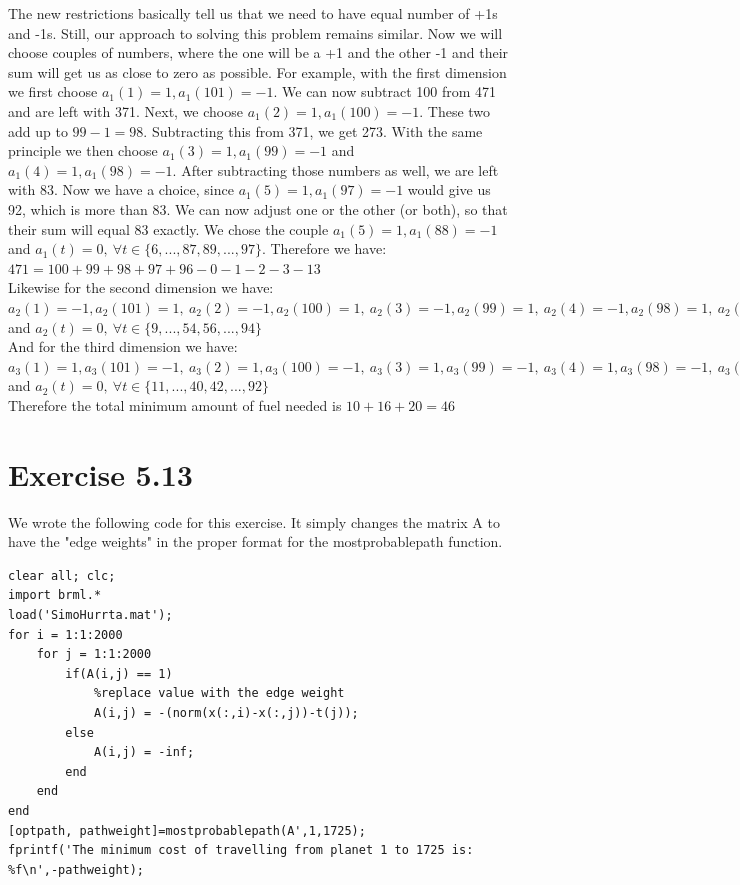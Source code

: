 \documentclass[11pt,a4paper,oneside]{report}
\begin{document}
The new restrictions basically tell us that we need to have equal number of +1s and -1s. Still, our approach to solving this problem remains similar. Now we will choose couples of numbers, where the one will be a +1 and the other -1 and their sum will get us as close to zero as possible. For example, with the first dimension we first choose $a_1(1) = 1, a_1(101) = -1$. We can now subtract 100 from 471 and are left with 371. Next, we choose $a_1(2) = 1, a_1(100) = -1$. These two add up to $99-1=98$. Subtracting this from 371, we get 273. With the same principle we then choose $a_1(3)=1,a_1(99)=-1$ and $a_1(4)=1,a_1(98)=-1$. After subtracting those numbers as well, we are left with 83. Now we have a choice, since $a_1(5)=1,a_1(97)=-1$ would give us 92, which is more than 83. We can now adjust one or the other (or both), so that their sum will equal 83 exactly. We chose the couple $a_1(5)=1,a_1(88)=-1$ and $a_1(t)=0,\ \forall t \in \{6,...,87,89,...,97\}$. Therefore we have:\\
$471 = 100 + 99 + 98 + 97 + 96 - 0 - 1 - 2 - 3 - 13$\\
Likewise for the second dimension we have:\\
$a_2(1)=-1,a_2(101)=1,\ a_2(2)=-1,a_2(100)=1,\ a_2(3)=-1,a_2(99)=1,\ a_2(4)=-1,a_2(98)=1,\ a_2(5)=-1,a_2(97)=1,\ a_2(6)=-1,a_2(96)=1,\ a_2(7)=-1,a_2(95)=1,\ a_2(8)=-1,a_2(55)=1$ and $a_2(t)=0,\ \forall t \in \{9,...,54,56,...,94\}$\\
And for the third dimension we have:\\
$a_3(1)=1,a_3(101)=-1,\ a_3(2)=1,a_3(100)=-1,\ a_3(3)=1,a_3(99)=-1,\ a_3(4)=1,a_3(98)=-1,\ a_3(5)=1,a_3(97)=-1,\ a_3(6)=1,a_3(96)=-1,\ a_3(7)=1,a_3(95)=-1,\ a_3(8)=1,a_3(94)=-1,\ a_3(9)=1,a_3(93)=-1,\ a_3(10)=1,a_3(41)=-1,\ $ and $a_2(t)=0,\ \forall t \in \{11,...,40,42,...,92\}$\\

Therefore the total minimum amount of fuel needed is $10+16+20=46$

\section*{Exercise 5.13}

We wrote the following code for this exercise. It simply changes the matrix A to have the "edge weights" in the proper format for the mostprobablepath function.

\begin{lstlisting}
clear all; clc;
import brml.*
load('SimoHurrta.mat');
for i = 1:1:2000
    for j = 1:1:2000
        if(A(i,j) == 1)
            %replace value with the edge weight
            A(i,j) = -(norm(x(:,i)-x(:,j))-t(j));
        else
            A(i,j) = -inf;
        end
    end
end
[optpath, pathweight]=mostprobablepath(A',1,1725);
fprintf('The minimum cost of travelling from planet 1 to 1725 is: %f\n',-pathweight); 
\end{lstlisting}
\end{document}
